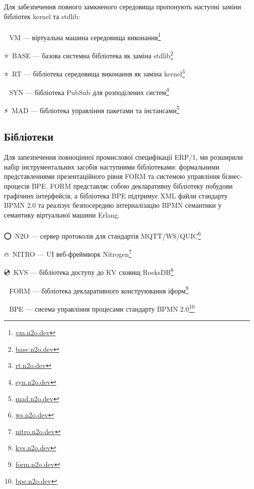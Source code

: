 Для забезпечення повного замкненого середовища пропонують наступні заміни бібліотек kernel та stdlib: \\
\\ \indent
\setmainfont{Segoe UI Emoji}🚀\setmainfont{Geometria}\ VM --- віртуальна машина середовища виконання\footnote{\url{vm.n2o.dev}}

\setmainfont{Segoe UI Emoji}⭐\setmainfont{Geometria}\ BASE --- базова системна бібліотека як заміна stdlib\footnote{\url{base.n2o.dev}}

\setmainfont{Segoe UI Emoji}⭐\setmainfont{Geometria}\ RT --- бібліотека середовища виконання як заміна kernel\footnote{\url{rt.n2o.dev}}

\setmainfont{Segoe UI Emoji}📨\setmainfont{Geometria}\ SYN --- бібліотека PubSub для розподілених систем\footnote{\url{syn.n2o.dev}}

\setmainfont{Segoe UI Emoji}⚡\setmainfont{Geometria}\ MAD --- бібліотека управління пакетами та інстансами\footnote{\url{mad.n2o.dev}}

\newpage
\subsection{Бібліотеки}

Для запезпечення повноцінної промислової специфікації ERP/1, ми розширили
набір інструментальних засобів наступними бібліотеками: формальними представленнями
презентаційного рівня FORM та системою управління бізнес-процесів BPE. FORM представляє
собою декларативну бібліотеку побудови графічних інтерфейсів, а бібліотека BPE
підтримує XML файли стандарту BPMN 2.0 та реалізує безпосередню інтерналізацію
BPMN семантики у семантику віртуальної машини Erlang. \\
\\ \indent
\setmainfont{Segoe UI Emoji}⭕\setmainfont{Geometria}\ N2O --- сервер протоколів для стандартів MQTT/WS/QUIC\footnote{\url{ws.n2o.dev}}

\setmainfont{Segoe UI Emoji}🔥\setmainfont{Geometria}\ NITRO --- UI веб-фреймворк Nitrogen\footnote{\url{nitro.n2o.dev}}

\setmainfont{Segoe UI Emoji}💿\setmainfont{Geometria}\ KVS --- бібліотека доступу до KV сховищ RocksDB\footnote{\url{kvs.n2o.dev}}

\setmainfont{Segoe UI Emoji}📜\setmainfont{Geometria}\ FORM --- бібліотека декларативного конструювання іформ\footnote{\url{form.n2o.dev}}

\setmainfont{Segoe UI Emoji}💠\setmainfont{Geometria}\ BPE --- сисема управління процесами стандарту BPMN 2.0\footnote{\url{bpe.n2o.dev}}


